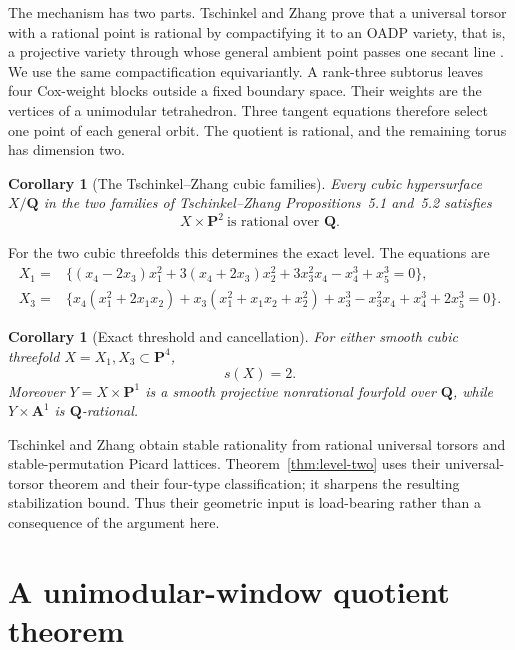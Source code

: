 \documentclass[11pt]{article}
\newtheorem{corollary}[theorem]{Corollary}
\theoremstyle{remark}
\newcommand{\A}{\mathbf A}
\newcommand{\PP}{\mathbf P}
\begin{document}
The mechanism has two parts.  Tschinkel and Zhang prove that a universal
torsor with a rational point is rational by compactifying it to an OADP
variety, that is, a projective variety through whose general ambient point
passes one secant line \cite[Theorem~3.4]{TZ}.  We use the same
compactification equivariantly.  A rank-three subtorus leaves four Cox-weight
blocks outside a fixed boundary space.  Their weights are the vertices of a
unimodular tetrahedron.  Three tangent equations therefore select one point
of each general orbit.  The quotient is rational, and the remaining torus has
dimension two.

\begin{corollary}[The Tschinkel--Zhang cubic families]
\label{cor:cubics}
%
%
%
Every cubic hypersurface \(X/\mathbf Q\) in the two families of
Tschinkel--Zhang Propositions~5.1 and~5.2 satisfies
\[
 X\times\PP^2\ \text{is rational over }\mathbf Q.
\]
\end{corollary}

For the two cubic threefolds this determines the exact level.  The equations
are
\begin{align}
X_1={}&\{(x_4-2x_3)x_1^2+3(x_4+2x_3)x_2^2
 +3x_3^2x_4-x_4^3+x_5^3=0\},\label{eq:cubic-one}\\
X_3={}&\{x_4(x_1^2+2x_1x_2)+x_3(x_1^2+x_1x_2+x_2^2)
 +x_3^3-x_3^2x_4+x_4^3+2x_5^3=0\}.\label{eq:cubic-three}
\end{align}

\begin{corollary}[Exact threshold and cancellation]
\label{cor:cancellation}
%
%
%
For either smooth cubic threefold \(X=X_1,X_3\subset\PP^4\),
\[
 s(X)=2.
\]
Moreover \(Y=X\times\PP^1\) is a smooth projective nonrational fourfold over
\(\mathbf Q\), while \(Y\times\A^1\) is \(\mathbf Q\)-rational.
\end{corollary}

Tschinkel and Zhang obtain stable rationality from rational universal torsors
and stable-permutation Picard lattices.  Theorem~\ref{thm:level-two} uses
their universal-torsor theorem and their four-type classification; it
sharpens the resulting stabilization bound.  Thus their geometric input is
load-bearing rather than a consequence of the argument here.

\section{A unimodular-window quotient theorem}
\end{document}
